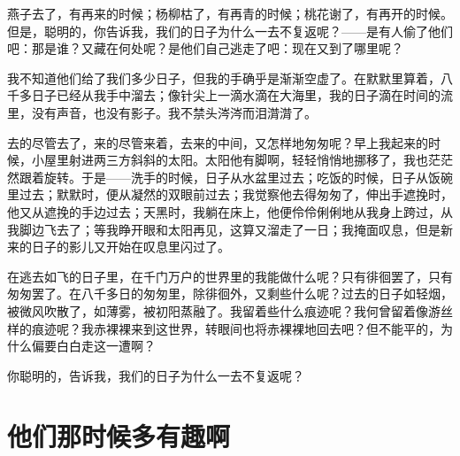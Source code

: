 \documentclass[12pt,UTF-8,openany]{ctexbook}
\begin{document}
\begin{large}
    
    燕子去了，有再来的时候；杨柳枯了，有再青的时候；桃花谢了，有再开的时候。但是，聪明的，你告诉我，我们的日子为什么一去不复返呢？——是有人偷了他们吧：那是谁？又藏在何处呢？是他们自己逃走了吧：现在又到了哪里呢？
    
    我不知道他们给了我们多少日子，但我的手确乎是渐渐空虚了。在默默里算着，八千多日子已经从我手中溜去；像针尖上一滴水滴在大海里，我的日子滴在时间的流里，没有声音，也没有影子。我不禁头涔涔而泪潸潸了。
    
    去的尽管去了，来的尽管来着，去来的中间，又怎样地匆匆呢？早上我起来的时候，小屋里射进两三方斜斜的太阳。太阳他有脚啊，轻轻悄悄地挪移了，我也茫茫然跟着旋转。于是——洗手的时候，日子从水盆里过去；吃饭的时候，日子从饭碗里过去；默默时，便从凝然的双眼前过去；我觉察他去得匆匆了，伸出手遮挽时，他又从遮挽的手边过去；天黑时，我躺在床上，他便伶伶俐俐地从我身上跨过，从我脚边飞去了；等我睁开眼和太阳再见，这算又溜走了一日；我掩面叹息，但是新来的日子的影儿又开始在叹息里闪过了。
    
    在逃去如飞的日子里，在千门万户的世界里的我能做什么呢？只有徘徊罢了，只有匆匆罢了。在八千多日的匆匆里，除徘徊外，又剩些什么呢？过去的日子如轻烟，被微风吹散了，如薄雾，被初阳蒸融了。我留着些什么痕迹呢？我何曾留着像游丝样的痕迹呢？我赤裸裸来到这世界，转眼间也将赤裸裸地回去吧？但不能平的，为什么偏要白白走这一遭啊？
    
    你聪明的，告诉我，我们的日子为什么一去不复返呢？
    
\end{large}



\chapter{他们那时候多有趣啊}
\end{document}
